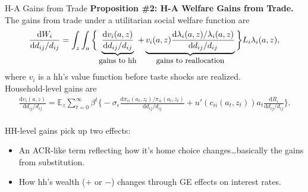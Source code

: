 \documentclass[9pt,pdftex,aspectratio=1610]{beamer}
\theoremstyle{definition}
\begin{document}
\begin{frame}[t]{H-A Gains from Trade}
\smallskip
\textbf{Proposition \#2: H-A Welfare Gains from Trade.} The gains from trade under a utilitarian social welfare function are
\begin{align*}
\frac{\mathrm{d} W_{i}}{\mathrm{d} d_{ij} / d_{ij}} = \int_{z} \int_{a}  \bigg \{ \underbrace{\frac{\mathrm{d} v_i(a, z)}{\mathrm{d} d_{ij} / d_{ij}}}_{\small \mbox{gains to hh}}  + \underbrace{v_{i}(a,z) \frac{\mathrm{d} \lambda_{i}(a,z)/ \lambda_{i}(a,z)}{\mathrm{d} d_{ij} / d_{ij}}}_{\small \mbox{gains to reallocation}}   \bigg \} L_i \lambda_{i}(a,z),
\nonumber
\end{align*}
where $v_i$ is a hh's value function before taste shocks are realized.\\
\medskip
Household-level gains are
\begin{align*}
\frac{\mathrm{d} v_i(a, z)}{\mathrm{d} d_{ij} / d_{ij}} = \mathbb{E}_{z} \sum_{t = 0}^{\infty} \beta^{t} \bigg \{ -\sigma_{\epsilon} \frac{\mathrm{d} \pi_{ii}(a_{t},z_{t}) / \pi_{ii}(a_{t},z_{t})}{\mathrm{d}d_{ij} / d_{ij}} + u'(c_{ii}(a_{t},z_{t}))a_{t} \frac{\mathrm{d} R_{i}}{\mathrm{d} d_{ij} / d_{ij}} \bigg \}.
\end{align*}\\
\bigskip
\medskip
HH-level gains pick up two effects:
\begin{itemize}
\item An ACR-like term reflecting how it's home choice changes\ldots basically the gains from substitution.
\smallskip
\item How hh's wealth ($+$ or $-$) changes through GE effects on interest rates.
\end{itemize}
\end{frame}

\end{document}
